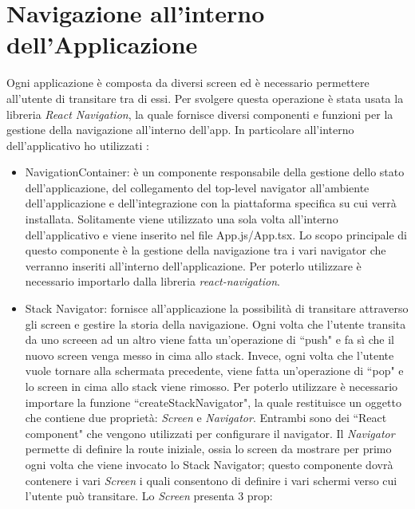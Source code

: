 \section{Navigazione all'interno dell'Applicazione}
Ogni applicazione \`e composta da diversi screen ed \`e necessario permettere all'utente di transitare tra di essi. Per svolgere questa operazione \`e stata usata la 
libreria \textit{React Navigation}, la quale fornisce diversi componenti e funzioni per la gestione della navigazione all'interno dell'app. In particolare all'interno 
dell'applicativo ho utilizzati \cite{ReactNavigationContainer}\cite{ReactNavigationStackNavigator}:
\begin{itemize}
    \item NavigationContainer: \`e un componente responsabile della gestione dello stato dell'applicazione, del collegamento del top-level navigator all'ambiente dell'applicazione e dell'integrazione con la piattaforma specifica su cui verr\`a installata.
          Solitamente viene utilizzato una sola volta all'interno dell'applicativo e viene inserito nel file App.js/App.tsx. Lo scopo principale di questo componente \`e la gestione della navigazione tra i vari navigator che verranno inseriti all'interno dell'applicazione. Per poterlo utilizzare \`e necessario importarlo dalla libreria \textit{react-navigation}.
    \item Stack Navigator: fornisce all'applicazione la possibilit\`a di transitare attraverso gli screen e gestire la storia della navigazione. Ogni volta che l'utente transita da uno screeen ad un altro viene fatta un'operazione di ``push" e fa s\`i che il nuovo screen venga messo in cima allo stack. Invece, ogni volta che l'utente vuole tornare
          alla schermata precedente, viene fatta un'operazione di ``pop" e lo screen in cima allo stack viene rimosso. Per poterlo utilizzare \`e necessario importare la funzione ``createStackNavigator", la quale restituisce un oggetto che contiene due propriet\`a: \textit{Screen} e \textit{Navigator}.
          Entrambi sono dei ``React component" che vengono utilizzati per configurare il navigator. Il \textit{Navigator} permette di definire la route iniziale, ossia lo screen da mostrare per primo ogni volta che viene invocato lo Stack Navigator; questo componente dovr\`a contenere i vari \textit{Screen} i quali consentono di definire i vari schermi verso cui l'utente pu\`o transitare.
          Lo \textit{Screen} presenta 3 prop:
\end{itemize}
